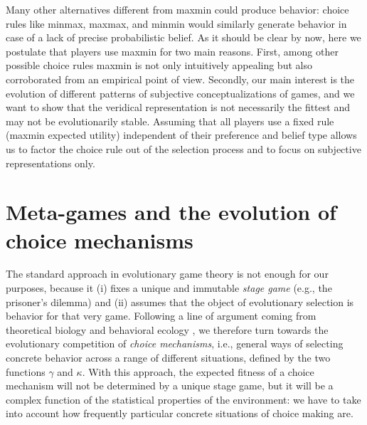 \documentclass[fleqn,reqno,11pt]{article}
\begin{document}

Many other alternatives different from maxmin could produce behavior: choice rules like minmax, maxmax, and minmin would similarly generate behavior in case of a lack of precise probabilistic belief. As it should be clear by now, here we postulate that players use maxmin for two main reasons. First, among other possible choice rules maxmin is not only intuitively appealing but also corroborated from an empirical point of view. Secondly, our main interest is the evolution of different patterns of subjective conceptualizations of games, and we want to show that the veridical representation is not necessarily the fittest and may not be evolutionarily stable. Assuming that all players use a fixed rule (maxmin expected utility) independent of their preference and belief type allows us to factor the choice rule out of the selection process and to focus on subjective representations only.




\iffalse

\begin{fact} \label{fact:maxEU-minReg}

For any probability measure $\mu$, maximization of expected utility and minimization of expected regret are behaviorally equivalent.

\end{fact}

\noindent As we have seen in the previous example, this is not the case in the presence of (radical) uncertainty, in the sense of representation of belief state in terms of a set of probability, as in $ \Delta $.
\fi





\section{Meta-games and the evolution of choice mechanisms}
\label{sec:model}

The standard approach in
evolutionary game theory is not enough for our purposes, because it (i) fixes a unique and immutable
\emph{stage game} (e.g., the prisoner's dilemma) and (ii) assumes that the object of
evolutionary selection is behavior for that very game. Following a line of argument coming from theoretical biology and behavioral ecology
\citep[e.g.,][]{FawcettHamblin2013:Exposing-the-be}, we therefore turn towards the evolutionary
competition of \emph{choice mechanisms}, i.e., general ways of selecting concrete behavior
across a range of different situations, defined by the two functions $\gamma$ and $\kappa$. With this approach, the expected fitness of a choice
mechanism will not be determined by a unique stage game, but it will be a
complex function of the statistical properties of the environment: we have to take into account
how frequently particular concrete situations of choice making are.
\end{document}
